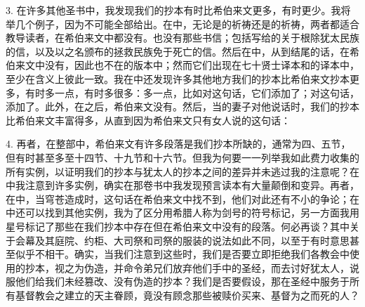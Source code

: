 3. 在许多其他圣书中，我发现我们的抄本有时比希伯来文更多，有时更少。我将举几个例子，因为不可能全部给出。在中，无论是的祈祷还是的祈祷，两者都适合教导读者，在希伯来文中都没有。也没有那些书信；包括写给的关于根除犹太民族的信，以及以之名颁布的拯救民族免于死亡的信。然后在中，从到结尾的话，在希伯来文中没有，因此也不在的版本中；然而它们出现在七十贤士译本和的译本中，至少在含义上彼此一致。我在中还发现许多其他地方我们的抄本比希伯来文抄本更多，有时多一点，有时多很多：多一点，比如对这句话，它们添加了；对这句话，添加了。此外，在之后，希伯来文没有。然后，当的妻子对他说话时，我们的抄本比希伯来文丰富得多，从直到因为希伯来文只有女人说的这句话：\par

4. 再者，在整部中，希伯来文有许多段落是我们抄本所缺的，通常为四、五节，但有时甚至多至十四节、十九节和十六节。但我为何要一一列举我如此费力收集的所有实例，以证明我们的抄本与犹太人的抄本之间的差异并未逃过我的注意呢？在中我注意到许多实例，确实在那卷书中我发现预言读本有大量颠倒和变异。再者，在中，当穹苍造成时，这句话在希伯来文中找不到，他们对此还有不小的争论；在中还可以找到其他实例，我为了区分用希腊人称为剑号的符号标记，另一方面我用星号标记了那些在我们抄本中存在但在希伯来文中没有的段落。何必再谈？其中关于会幕及其庭院、约柜、大司祭和司祭的服装的说法如此不同，以至于有时意思甚至似乎不相干。确实，当我们注意到这些时，我们是否要立即拒绝我们各教会中使用的抄本，视之为伪造，并命令弟兄们放弃他们手中的圣经，而去讨好犹太人，说服他们给我们未经篡改、没有伪造的抄本？我们是否要假设，那在圣经中服务于所有基督教会之建立的天主眷顾，竟没有顾念那些被赎价买来、基督为之而死的人？\par

